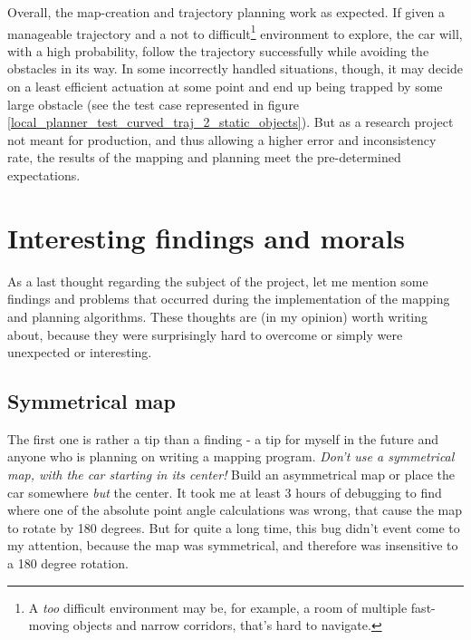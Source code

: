 Overall, the map-creation and trajectory planning work as expected. If given a manageable trajectory and a not to difficult\footnote{A \textit{too} difficult environment may be, for example, a room of multiple fast-moving objects and narrow corridors, that's hard to navigate.} environment to explore, the car will, with a high probability, follow the trajectory successfully while avoiding the obstacles in its way. In some incorrectly handled situations, though, it may decide on a least efficient actuation at some point and end up being trapped by some large obstacle (see the test case represented in figure \ref{local_planner_test_curved_traj_2_static_objects}). But as a research project not meant for production, and thus allowing a higher error and inconsistency rate, the results of the mapping and planning meet the pre-determined expectations.

\section{Interesting findings and morals}
As a last thought regarding the subject of the project, let me mention some findings and problems that occurred during the implementation of the mapping and planning algorithms. These thoughts are (in my opinion) worth writing about, because they were surprisingly hard to overcome or simply were unexpected or interesting.

\subsection{Symmetrical map}
The first one is rather a tip than a finding - a tip for myself in the future and anyone who is planning on writing a mapping program. \textit{Don't use a symmetrical map, with the car starting in its center!} Build an asymmetrical map or place the car somewhere \textit{but} the center. It took me at least 3 hours of debugging to find where one of the absolute point angle calculations was wrong, that cause the  map to rotate by 180 degrees. But for quite a long time, this bug didn't event come to my attention, because the map was symmetrical, and therefore was insensitive to a 180 degree rotation.

